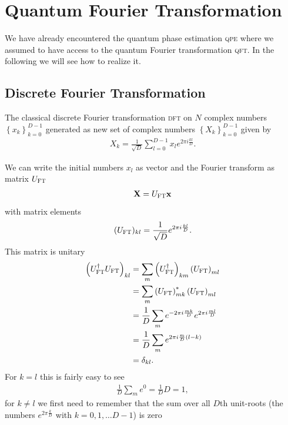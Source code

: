 \section{Quantum Fourier Transformation}
We have already encountered the quantum phase estimation \textsc{qpe} where we assumed to have access to the quantum Fourier transformation \textsc{qft}. In the following we will see how to realize it.

\subsection{Discrete Fourier Transformation} 
\begin{def*}
The classical discrete Fourier transformation \textsc{dft} on $N$ complex numbers $\left
\{ x_k
\right\}_{k=0}^{D-1}$ generated as new set of complex numbers $\left
\{ X_k
\right\}_{k=0}^{D-1}$ given by
\begin{align}
    X_k = \frac{1}{\sqrt{D}} \sum_{l=0}^{D-1} x_l e^{2\pi i \frac{kl}{D}}.
\end{align}
\end{def*}
We can write the initial numbers $x_l$ as vector and the Fourier transform as matrix $U_{\textsc{FT}}$ 
\begin{align}
    \mathbf{X} = U_{\textsc{FT}} \mathbf{x}
\end{align} 
with matrix elements
\begin{align}
    (U_{\textsc{FT}})_{kl} = \frac{1}{\sqrt{D}} e^{2\pi i \frac{kl}{D}}.
\end{align}
This matrix is unitary
\begin{align}
    \left(U_{\textsc{FT}}^\dagger U_{\textsc{FT}}\right)_{kl} &= \sum_{m} \left(U_{\textsc{FT}}^\dagger\right)_{km} \left(U_{\textsc{FT}}\right)_{ml}\\
    &=\sum_{m} \left(U_{\textsc{FT}}\right)_{mk}^* \left(U_{\textsc{FT}}\right)_{ml}\\
    &=\frac{1}{D}\sum_{m} e^{-2\pi i \frac{mk}{D}} e^{2\pi i \frac{ml}{D}}\\
    &=\frac{1}{D}\sum_{m} e^{2\pi i\frac{m}{D}\left(l - k\right)}\\
    &=\delta_{kl}.
\end{align}
For $k=l$ this is fairly easy to see
\begin{align}
    \frac{1}{D}\sum_{m} e^{0 } = \frac{1}{D} D = 1,
\end{align}
for $k\neq l$ we first need to remember that the sum over all $D$th unit-roots (the numbers $e^{2\pi \frac{k}{D}}$ with $k=0,1,\dots D-1$) is zero
